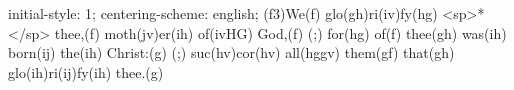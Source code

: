 initial-style: 1;
centering-scheme: english;
(f3)We(f) glo(gh)ri(iv)fy(hg) <sp>*</sp> thee,(f) moth(jv)er(ih) of(ivHG) God,(f) (;) for(hg) of(f) thee(gh) was(ih) born(ij) the(ih) Christ:(g) (;) suc(hv)cor(hv) all(hggv) them(gf) that(gh) glo(ih)ri(ij)fy(ih) thee.(g)
